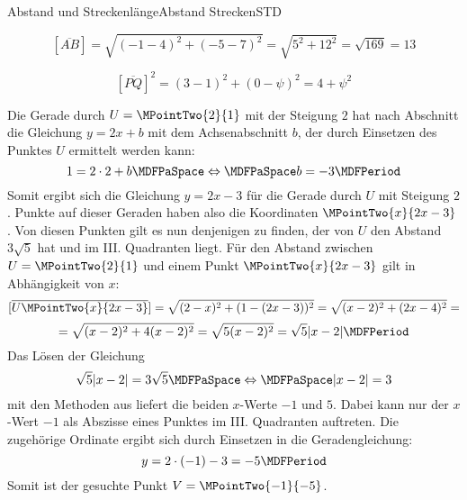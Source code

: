 \begin{MXContent}{Abstand und Streckenlänge}{Abstand Strecken}{STD}
\begin{MExercise}
\begin{MHint}{\iSolution} 
\begin{MExerciseItems}
\item{\[
       [\overline{A B}] = \sqrt{(-1-4)^2+(-5-7)^2} = \sqrt{5^2+12^2} = \sqrt{169} = 13
      \]
} 
\item{\[
       [\overline{P Q}]^2 = (3-1)^2 + (0-\psi)^2 = 4+\psi^2
      \]
}
\item{Die Gerade durch $U=\MPointTwo{2}{1}$ mit der Steigung $2$ hat nach Abschnitt  die Gleichung $y=2x+b$ mit dem Achsenabschnitt $b$, der durch Einsetzen des Punktes $U$ ermittelt werden kann:
\[
 1 = 2\cdot 2 + b\MDFPaSpace\Leftrightarrow\MDFPaSpace b=-3\MDFPeriod
\]
Somit ergibt sich die Gleichung $y=2x-3$ für die Gerade durch $U$ mit Steigung $2$. Punkte auf dieser Geraden haben also die Koordinaten $\MPointTwo{x}{2x-3}$. Von diesen Punkten gilt es nun denjenigen zu finden, der von $U$ den Abstand $3\sqrt{5}$ hat und im III. Quadranten liegt. Für den Abstand zwischen $U=\MPointTwo{2}{1}$ und einem Punkt $\MPointTwo{x}{2x-3}$ gilt in Abhängigkeit von $x$:
\[
 [\overline{U\MPointTwo{x}{2x-3}}] = \sqrt{(2-x)^2+(1-(2x-3))^2}=\sqrt{(x-2)^2 + (2x-4)^2} =
\]
\[
 = \sqrt{(x-2)^2 + 4(x-2)^2} = \sqrt{5(x-2)^2} = \sqrt{5}|x-2|\MDFPeriod
\]
Das Lösen der Gleichung
\[
 \sqrt{5}|x-2| = 3\sqrt{5}\MDFPaSpace\Leftrightarrow\MDFPaSpace |x-2|=3
\]
mit den Methoden aus  liefert die beiden $x$-Werte $-1$ und $5$. Dabei kann nur der $x$-Wert $-1$ als Abszisse eines Punktes im III. Quadranten auftreten. Die zugehörige Ordinate ergibt sich durch Einsetzen in die Geradengleichung:
\[
 y = 2\cdot(-1)-3 = -5\MDFPeriod
\]
Somit ist der gesuchte Punkt $V=\MPointTwo{-1}{-5}$.

}
\end{MExerciseItems}

\end{MHint} 

\end{MExercise}



\end{MXContent}

